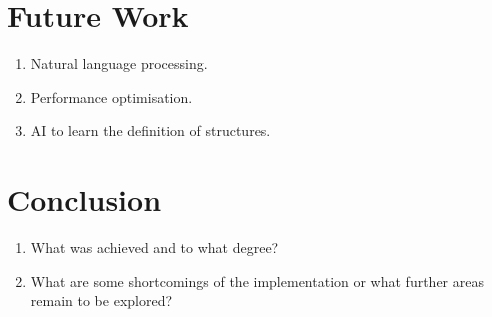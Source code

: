 \documentclass{fict}
\begin{document}
\begin{flushleft}
\section*{Future Work}
\begin{enumerate}
    \item Natural language processing.
    \item Performance optimisation.
    \item AI to learn the definition of structures.
\end{enumerate}

\section*{Conclusion}
\begin{enumerate}
    \item What was achieved and to what degree?
    \item What are some shortcomings of the implementation or what further areas remain to be explored?
\end{enumerate}
    
\end{flushleft}
\end{document}
